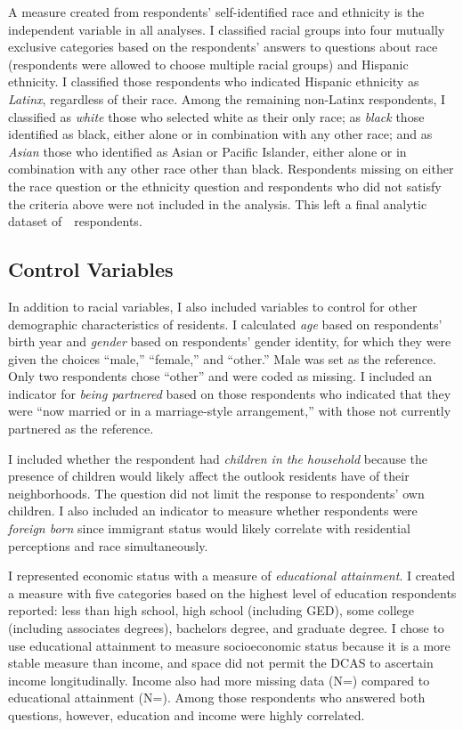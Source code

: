 \documentclass{baderart}
\begin{document}
A measure created from respondents' self-identified race and ethnicity is the independent variable in all analyses. I classified racial groups into four mutually exclusive categories based on the respondents' answers to questions about race (respondents were allowed to choose multiple racial groups) and Hispanic ethnicity. 
I classified those respondents who indicated Hispanic ethnicity as \emph{Latinx}, regardless of their race. Among the remaining non-Latinx respondents, I classified as \emph{white} those who selected white as their only race; as \emph{black} those identified as black, either alone or in combination with any other race; and as \emph{Asian} those who identified as Asian or Pacific Islander, either alone or in combination with any other race other than black. Respondents missing on either the race question or the ethnicity question and respondents who did not satisfy the criteria above were not included in the analysis. This left a final analytic dataset of~\N\ respondents.

\subsection{Control Variables}\label{control-variables}

In addition to racial variables, I also included variables to control for other demographic characteristics of residents. I calculated \emph{age} based on respondents' birth year and \emph{gender} based on respondents' gender identity, for which they were given the choices ``male,'' ``female,'' and ``other.'' Male was set as the reference. Only two respondents chose ``other'' and were coded as missing. I included an indicator for \emph{being partnered} based on those respondents who indicated that they were ``now married or in a marriage-style arrangement,'' with those not currently partnered as the reference.

I included whether the respondent had \emph{children in the household} because the presence of children would likely affect the outlook residents have of their neighborhoods. The question did not limit the response to respondents' own children. I also included an indicator to measure whether respondents were \emph{foreign born} since immigrant status would likely correlate with residential perceptions and race simultaneously.

I represented economic status with a measure of \emph{educational attainment}. I created a measure with five categories based on the highest level of education respondents reported: less than high school, high school (including GED), some college (including associates degrees), bachelors degree, and graduate degree. I chose to use educational attainment to measure socioeconomic status because it is a more stable measure than income, and space did not permit the DCAS to ascertain income longitudinally. Income also had more missing data  (N=\miinc) compared to educational attainment (N=\miedu). Among those respondents who answered both questions, however, education and income were highly correlated.
\end{document}
